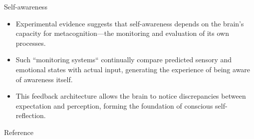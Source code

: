 \begin{frame}{Self-awareness}
    \begin{itemize}
        \item Experimental evidence suggests that self-awareness depends on the brain's capacity for metacognition—the monitoring and evaluation of its own processes.
        \item Such ``monitoring systems`` continually compare predicted sensory and emotional states with actual input, generating the experience of being aware of awareness itself.
        \item This feedback architecture allows the brain to notice discrepancies between expectation and perception, forming the foundation of conscious self-reflection.
    \end{itemize}
    Reference \cite{garcia-2013-stuck-in-the-moment}
\end{frame}